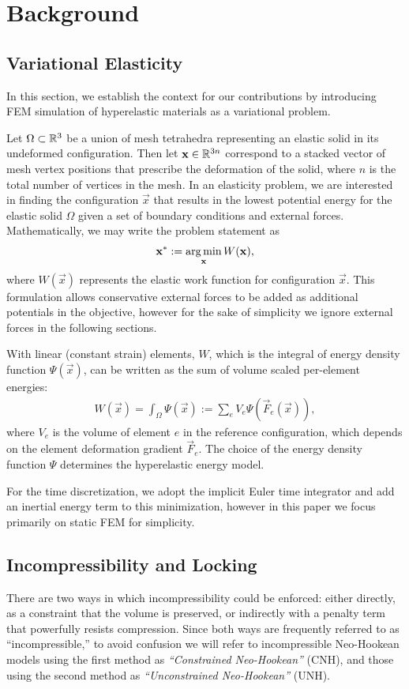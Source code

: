 \chapter{Background}
\label{ch:Background}

\section{Variational Elasticity}
In this section, we establish the context for our contributions by introducing FEM simulation of
hyperelastic materials as a variational problem.

Let $\Omega \subset \mathbb{R}^{3}$ be a union of mesh tetrahedra representing an elastic solid in its
undeformed configuration. Then let $\mathbf{x} \in \mathbb{R}^{3n}$ correspond to a stacked vector of mesh vertex
positions that prescribe the deformation of the solid, where $n$ is the total number of vertices
in the mesh. In an elasticity problem, we are
interested in finding the configuration $\vec{x}$ that results in the lowest potential energy
for the elastic solid $\Omega$ given a set of boundary conditions
and external forces. Mathematically, we may write the problem statement as
\begin{align}
\mathbf{x}^* := \operatorname*{arg\,min}_{\mathbf{x}} W(\mathbf{x}),
\label{eq:energy_min}
\end{align}
where $W(\vec{x})$ represents the elastic work function for configuration $\vec{x}$. 
This formulation allows conservative external forces to be added as additional potentials in the
objective, however for the sake of simplicity we ignore external forces in the following sections.

With linear (constant strain) elements, $W$, which is the integral of energy density function $\Psi(\vec{x})$, can be written as the sum of volume scaled per-element energies:
\begin{align}
W(\vec{x}) = \int_{\Omega} \Psi(\vec{x}) := \sum_{e} V_{e} \Psi(\vec{F}_e(\vec{x})),
\label{eq:total_energy}
\end{align}
where $V_e$ is the volume of element $e$ in the reference configuration, which depends on the element deformation gradient $\vec{F}_e$.  The choice of the energy density function $\Psi$ determines the hyperelastic energy model. 

For the time discretization, we adopt the implicit Euler time integrator and add an inertial
energy term to this minimization, however in this paper we focus primarily on static FEM for
simplicity. 

\section{Incompressibility and Locking}
There are two ways in which incompressibility could be enforced: either directly, as a constraint that the volume is preserved, or indirectly with a penalty term that powerfully resists compression. Since both ways are frequently referred to as ``incompressible,'' to avoid confusion we will refer to incompressible Neo-Hookean models using the first method as {\em ``Constrained Neo-Hookean''} (CNH), and those using the second method as
{\em ``Unconstrained Neo-Hookean''} (UNH).


